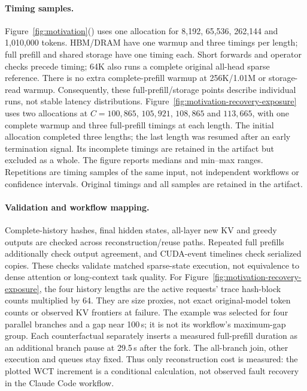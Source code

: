 \documentclass[sigplan,10pt,anonymous,nonacm]{acmart}
\begin{document}
\paragraph{Timing samples.}
Figure~\ref{fig:motivation}() uses one
allocation for 8,192, 65,536, 262,144 and 1,010,000 tokens. HBM/DRAM have
one warmup and three timings per length; full prefill and shared storage
have one timing each. Short forwards and operator checks precede timing;
64K also runs a complete original all-head sparse reference. There is
no extra complete-prefill warmup at 256K/1.01M or storage-read warmup.
Consequently, these full-prefill/storage points describe individual
runs, not stable latency distributions.
Figure~\ref{fig:motivation-recovery-exposure} uses two allocations at
$C=100{,}865$, $105{,}921$, $108{,}865$ and $113{,}665$, with one complete
warmup and three full-prefill timings at each length. The initial allocation completed three lengths; the last length was
resumed after an early termination signal. Its incomplete timings are
retained in the artifact but excluded as a whole. The figure reports
medians and min--max ranges. Repetitions are timing samples of the same input,
not independent workflows or confidence intervals. Original timings and
all samples are retained in the artifact.

\paragraph{Validation and workflow mapping.}
Complete-history hashes, final hidden states, all-layer new KV and greedy
outputs are checked across reconstruction/reuse paths. Repeated full
prefills additionally check output agreement, and CUDA-event timelines
check serialized copies. These checks validate matched sparse-state
execution, not equivalence to dense attention or long-context task quality.
For Figure~\ref{fig:motivation-recovery-exposure}, the four history lengths
are the active requests' trace hash-block counts multiplied by 64.
They are size proxies, not exact original-model token counts or observed
KV frontiers at failure. The example was selected for four parallel
branches and a gap near 100\,s; it is not its workflow's maximum-gap group.
Each counterfactual separately inserts a measured full-prefill duration
as an additional branch pause at 29.5\,s after the fork. The all-branch
join, other execution and queues stay fixed. Thus only reconstruction
cost is measured: the plotted WCT increment is a conditional calculation,
not observed fault recovery in the Claude Code workflow.
\end{document}
